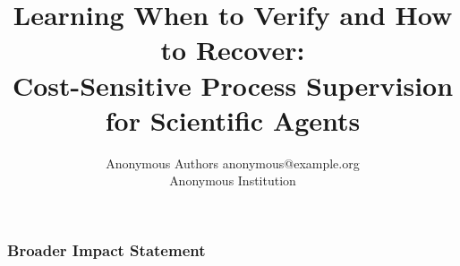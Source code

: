 \documentclass[10pt]{article}
\title{Learning When to Verify and How to Recover:\\
Cost-Sensitive Process Supervision for Scientific Agents}
\author{\name Anonymous Authors \email anonymous@example.org \\
       \addr Anonymous Institution}
\begin{document}
\maketitle

\begin{abstract}

\end{abstract}










\subsubsection*{Broader Impact Statement}






\appendix

\end{document}
